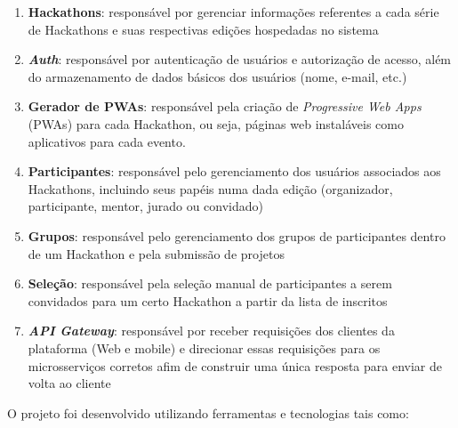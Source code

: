 \documentclass[10pt,twoside,a4paper]{article}
\begin{document}
    \begin{enumerate}
        \item \textbf{Hackathons}: responsável por gerenciar informações referentes a cada série de Hackathons e suas respectivas edições hospedadas no sistema
        
        \item \textbf{\textit{Auth}}: responsável por autenticação de usuários e autorização de acesso, além do armazenamento de dados básicos dos usuários (nome, e-mail, etc.)
        
        \item \textbf{Gerador de PWAs}: responsável pela criação de \textit{Progressive Web Apps} (PWAs) para cada Hackathon, ou seja, páginas web instaláveis como aplicativos para cada evento.
        
         \item \textbf{Participantes}: responsável pelo gerenciamento dos usuários associados aos Hackathons, incluindo seus papéis numa dada edição (organizador, participante, mentor, jurado ou convidado)
         
         \item \textbf{Grupos}: responsável pelo gerenciamento dos grupos de participantes dentro de um Hackathon e pela submissão de projetos
         
         \item \textbf{Seleção}: responsável pela seleção manual de participantes a serem convidados para um certo Hackathon a partir da lista de inscritos
         
         \item \textbf{\textit{API Gateway}}: responsável por receber requisições dos clientes da plataforma (Web e mobile) e direcionar essas requisições para os microsserviços corretos afim de construir uma única resposta para enviar de volta ao cliente
    \end{enumerate}
    
    O projeto foi desenvolvido utilizando ferramentas e tecnologias tais como:
    
\end{document}
